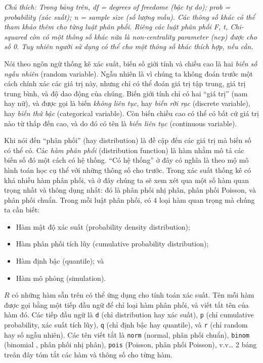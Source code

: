 \documentclass[
]{book}
\begin{document}
\emph{Chú thích: Trong bảng trên, df = degrees of freedome (bậc tự do); prob = probability (xác suất); n = sample size (số lượng mẫu). Các thông số khác có thể tham khảo thêm cho từng luật phân phối. Riêng các luật phân phối F, t, Chi-squared còn có một thông số khác nữa là non-centrality parameter (ncp) được cho số 0. Tuy nhiên người sử dụng có thể cho một thông số khác thích hợp, nếu cần.}

Nói theo ngôn ngữ thống kê xác suất, biến số giới tính và chiều cao là hai \emph{biến số} \emph{ngẫu nhiên} (random variable). Ngẫu nhiên là vì chúng ta không đoán trước một cách chính xác các giá trị này, nhưng chỉ có thể đoán giá trị tập trung, giá trị trung bình, và độ dao động của chúng. Biến giới tính chỉ có hai ``giá trị'' (nam hay nữ), và được gọi là biến \emph{không liên tục}, hay \emph{biến rời rạc} (discrete variable), hay \emph{biến thứ bậc} (categorical variable). Còn biến chiều cao có thể có bất cứ giá trị nào từ thấp đến cao, và do đó có tên là \emph{biến liên tục} (continuous variable).

Khi nói đến ``phân phối'' (hay distribution) là đề cập đến các giá trị mà biến số có thể có. Các \emph{hàm phân phối} (distribution function) là hàm nhằm mô tả các biến số đó một cách có hệ thống. ``Có hệ thống'' ở đây có nghĩa là theo mộ mô hình toán học cụ thể với những thông số cho trước. Trong xác suất thống kê có khá nhiều hàm phân phối, và ở đây chúng ta sẽ xem xét qua một số hàm quan trọng nhất và thông dụng nhất: đó là phân phối nhị phân, phân phối Poisson, và phân phối chuẩn. Trong mỗi luật phân phối, có 4 loại hàm quan trọng mà chúng ta cần biết:

\begin{itemize}
\item
  Hàm mật độ xác suất (probability density distribution);
\item
  Hàm phân phối tích lũy (cumulative probability distribution);
\item
  Hàm định bậc (quantile); và
\item
  Hàm mô phỏng (simulation).
\end{itemize}

\(R\) có những hàm sẵn trên có thể ứng dụng cho tính toán xác suất. Tên mỗi hàm được gọi bằng một tiếp đầu ngữ để chỉ loại hàm phân phối, và viết tắt tên của hàm đó. Các tiếp đầu ngữ là \texttt{d} (chỉ distribution hay xác suất), \texttt{p} (chỉ cumulative probability, xác suất tích lũy), \texttt{q} (chỉ định bậc hay quantile), và \texttt{r} (chỉ random hay số ngẫu nhiên). Các tên viết tắt là \texttt{norm} (normal, phân phối chuẩn), \texttt{binom} (binomial , phân phối nhị phân), \texttt{pois} (Poisson, phân phối Poisson), v.v\ldots{} 2 bảng treân đây tóm tắt các hàm và thông số cho từng hàm.
\end{document}
